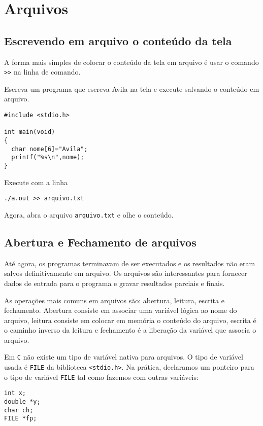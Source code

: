 

\chapter{Arquivos}
\section{Escrevendo em arquivo o conteúdo da tela}
A forma mais simples de colocar o conteúdo da tela em arquivo é usar o comando \verb|>>| na linha de comando.
\begin{ex}
Escreva um programa que escreva Avila na tela e execute salvando o conteúdo em arquivo.
\end{ex}
\begin{verbatim}
#include <stdio.h>

int main(void)
{
  char nome[6]="Avila";
  printf("%s\n",nome);
}
\end{verbatim}
Execute com a linha
\begin{verbatim}
./a.out >> arquivo.txt
\end{verbatim}
Agora, abra o arquivo \verb|arquivo.txt| e olhe o conteúdo.

\section{Abertura e Fechamento de arquivos}
Até agora, os programas terminavam de ser executados e os resultados não eram salvos definitivamente em arquivo. Os arquivos são interessantes para fornecer dados de entrada para o programa e gravar resultados parciais e finais.

As operações mais comuns em arquivos são: abertura, leitura, escrita e fechamento. Abertura consiste em associar uma variável lógica ao nome do arquivo, leitura consiste em colocar em memória o conteúdo do arquivo, escrita é o caminho inverso da leitura e fechamento é a liberação da variável que associa o arquivo.

Em \verb|C| não existe um tipo de variável nativa para arquivos. O tipo de variável usada é \verb|FILE| da biblioteca \verb|<stdio.h>|. Na prática, declaramos um ponteiro para o tipo de variável \verb|FILE| tal como fazemos com outras variáveis:
\begin{verbatim}
int x;
double *y;
char ch;
FILE *fp;
\end{verbatim}

